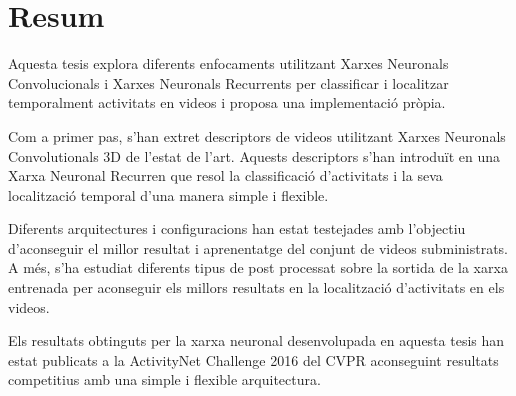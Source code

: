 \chapter*{Resum}

Aquesta tesis explora diferents enfocaments utilitzant Xarxes Neuronals Convolucionals i Xarxes Neuronals Recurrents per classificar i localitzar temporalment activitats en videos i proposa una implementació pròpia.

Com a primer pas, s'han extret descriptors de videos utilitzant Xarxes Neuronals Convolutionals 3D de l'estat de l'art. Aquests descriptors s'han introduït en una Xarxa Neuronal Recurren que resol la classificació d'activitats i la seva localització temporal d'una manera simple i flexible.

Diferents arquitectures i configuracions han estat testejades amb l'objectiu d'aconseguir el millor resultat i aprenentatge del conjunt de videos subministrats. A més, s'ha estudiat diferents tipus de post processat sobre la sortida de la xarxa entrenada per aconseguir els millors resultats en la localització d'activitats en els videos.

Els resultats obtinguts per la xarxa neuronal desenvolupada en aquesta tesis han estat publicats a la ActivityNet Challenge 2016 del CVPR aconseguint resultats competitius amb una simple i flexible arquitectura.
